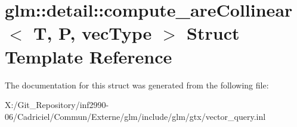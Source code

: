 \hypertarget{structglm_1_1detail_1_1compute__are_collinear}{\section{glm\-:\-:detail\-:\-:compute\-\_\-are\-Collinear$<$ T, P, vec\-Type $>$ Struct Template Reference}
\label{structglm_1_1detail_1_1compute__are_collinear}
}


The documentation for this struct was generated from the following file\-:\begin{DoxyCompactItemize}
\item 
X\-:/\-Git\-\_\-\-Repository/inf2990-\/06/\-Cadriciel/\-Commun/\-Externe/glm/include/glm/gtx/vector\-\_\-query.\-inl\end{DoxyCompactItemize}
